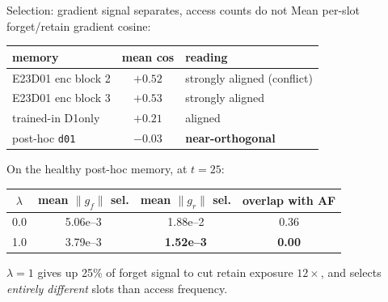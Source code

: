 \documentclass{beamer}
\newcommand{\gf}{\ensuremath{g_f}}
\newcommand{\gr}{\ensuremath{g_r}}
\begin{document}
\begin{frame}{Selection: gradient signal separates, access counts do not}
Mean per-slot forget/retain gradient cosine:
\begin{center}
\begin{tabular}{|l|c|l|}
\hline
memory & mean cos & reading \\
\hline
E23D01 enc block 2 & $+0.52$ & strongly aligned (conflict) \\
E23D01 enc block 3 & $+0.53$ & strongly aligned \\
trained-in D1only  & $+0.21$ & aligned \\
post-hoc \texttt{d01} & $-0.03$ & \textbf{near-orthogonal} \\
\hline
\end{tabular}
\end{center}

On the healthy post-hoc memory, at $t=25$:
\begin{center}
\begin{tabular}{|c|c|c|c|}
\hline
$\lambda$ & mean $\|\gf\|$ sel. & mean $\|\gr\|$ sel. & overlap with AF \\
\hline
0.0 & 5.06e--3 & 1.88e--2 & 0.36 \\
1.0 & 3.79e--3 & \textbf{1.52e--3} & \textbf{0.00} \\
\hline
\end{tabular}
\end{center}

$\lambda{=}1$ gives up 25\% of forget signal to cut retain exposure
$12\times$, and selects \emph{entirely different} slots than access frequency.
\end{frame}
\end{document}
